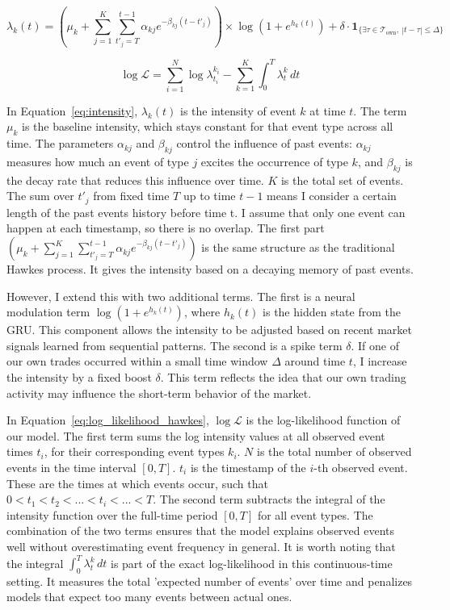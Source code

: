 \begin{equation}
    \lambda_k(t) = (\mu_k + \sum_{j=1}^{K} \sum_{t'_j=T}^{t-1} \alpha_{kj} e^{-\beta_{kj}(t - t'_j)}) \times \log(1+e^{h_k(t)}) + \delta \cdot \mathbf{1}_{\{\exists \tau \in \mathcal{T}_{\text{own}},\ |t - \tau| \leq \Delta \}}
    \label{eq:intensity}
\end{equation}

\begin{equation}
    \log \mathcal{L} = \sum_{i=1}^{N} \log \lambda_{t_i}^{k_i} - \sum_{k=1}^{K} \int_{0}^{T} \lambda_t^{k} \, dt
    \label{eq:log_likelihood_hawkes}
\end{equation}

In Equation~\ref{eq:intensity}, $\lambda_k(t)$ is the intensity of event $k$ at time $t$. The term $\mu_k$ is the baseline intensity, which stays constant for that event type across all time. The parameters $\alpha_{kj}$ and $\beta_{kj}$ control the influence of past events: $\alpha_{kj}$ measures how much an event of type $j$ excites the occurrence of type $k$, and $\beta_{kj}$ is the decay rate that reduces this influence over time. $K$ is the total set of events. The sum over $t'_j$ from fixed time $T$ up to time $t-1$ means I consider a certain length of the past events history before time t. I assume that only one event can happen at each timestamp, so there is no overlap. The first part $(\mu_k + \sum_{j=1}^{K} \sum_{t'_j=T}^{t-1} \alpha_{kj} e^{-\beta_{kj}(t - t'_j)})$ is the same structure as the traditional Hawkes process. It gives the intensity based on a decaying memory of past events. 

However, I extend this with two additional terms. The first is a neural modulation term \( \log(1 + e^{h_k(t)}) \), where \( h_k(t) \) is the hidden state from the GRU. This component allows the intensity to be adjusted based on recent market signals learned from sequential patterns. The second is a spike term $\delta$. If one of our own trades occurred within a small time window \( \Delta \) around time \( t \), I increase the intensity by a fixed boost \( \delta \). This term reflects the idea that our own trading activity may influence the short-term behavior of the market.

In Equation~\ref{eq:log_likelihood_hawkes}, \( \log \mathcal{L} \) is the log-likelihood function of our model. The first term sums the log intensity values at all observed event times \( t_i \), for their corresponding event types \( k_i \). $N$ is the total number of observed events in the time interval \([0, T]\). $t_i$ is the timestamp of the $i$-th observed event. These are the times at which events occur, such that $0<t_1<t_2<...<t_i<...<T$.
The second term subtracts the integral of the intensity function over the full-time period \([0, T]\) for all event types. The combination of the two terms ensures that the model explains observed events well without overestimating event frequency in general. It is worth noting that the integral $\int_{0}^{T} \lambda_t^{k} \, dt$ is part of the exact log-likelihood in this continuous-time setting. It measures the total 'expected number of events' over time and penalizes models that expect too many events between actual ones.


